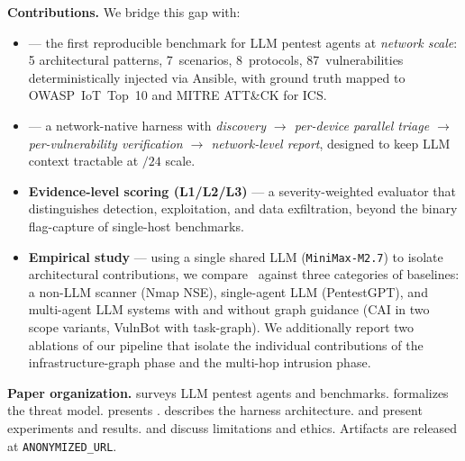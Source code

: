 \noindent\textbf{Contributions.} We bridge this gap with:
\begin{itemize}
  \item \textbf{\systemname} — the first reproducible benchmark for LLM pentest
  agents at \emph{network scale}: 5 architectural patterns, 7~scenarios, 8~protocols,
  87~vulnerabilities deterministically injected via Ansible, with ground truth mapped
  to OWASP~IoT~Top~10 and MITRE ATT\&CK for ICS.
  \item \textbf{\harnessname} — a network-native harness with \emph{discovery $\to$
  per-device parallel triage $\to$ per-vulnerability verification $\to$ network-level
  report}, designed to keep LLM context tractable at $/24$ scale.
  \item \textbf{Evidence-level scoring (L1/L2/L3)} — a severity-weighted evaluator
  that distinguishes detection, exploitation, and data exfiltration, beyond the
  binary flag-capture of single-host benchmarks.
  \item \textbf{Empirical study} — using a single shared LLM (\texttt{MiniMax-M2.7})
  to isolate architectural contributions, we compare \harnessname\ against
  three categories of baselines: a non-LLM scanner (Nmap NSE), single-agent
  LLM (PentestGPT), and multi-agent LLM systems with and without graph guidance
  (CAI in two scope variants, VulnBot with task-graph). We additionally report
  two ablations of our pipeline that isolate the individual contributions of
  the infrastructure-graph phase and the multi-hop intrusion phase.
\end{itemize}


\noindent\textbf{Paper organization.}
 surveys LLM pentest agents and benchmarks.
 formalizes the threat model.
 presents \systemname.
 describes the harness architecture.
 and  present experiments and results.
 and  discuss limitations and ethics.
Artifacts are released at \texttt{ANONYMIZED\_URL}.
